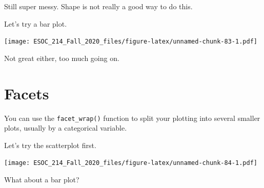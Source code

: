 \documentclass[
]{book}
\newenvironment{Shaded}{\begin{snugshade}}{\end{snugshade}}
\newcommand{\DataTypeTok}[1]{\textcolor[rgb]{0.13,0.29,0.53}{#1}}
\newcommand{\KeywordTok}[1]{\textcolor[rgb]{0.13,0.29,0.53}{\textbf{#1}}}
\newcommand{\NormalTok}[1]{#1}
\newcommand{\OperatorTok}[1]{\textcolor[rgb]{0.81,0.36,0.00}{\textbf{#1}}}
\newcommand{\StringTok}[1]{\textcolor[rgb]{0.31,0.60,0.02}{#1}}
\begin{document}
Still super messy. Shape is not really a good way to do this.

Let's try a bar plot.

\begin{Shaded}
\end{Shaded}

\texttt{[image: ESOC\_214\_Fall\_2020\_files/figure-latex/unnamed-chunk-83-1.pdf]}

Not great either, too much going on.

\hypertarget{facets}{%
\section{Facets}\label{facets}}

You can use the \texttt{facet\_wrap()} function to split your plotting into several smaller plots, usually by a categorical variable.

Let's try the scatterplot first.

\begin{Shaded}
\end{Shaded}

\texttt{[image: ESOC\_214\_Fall\_2020\_files/figure-latex/unnamed-chunk-84-1.pdf]}

What about a bar plot?

\begin{Shaded}
\end{Shaded}
\end{document}
